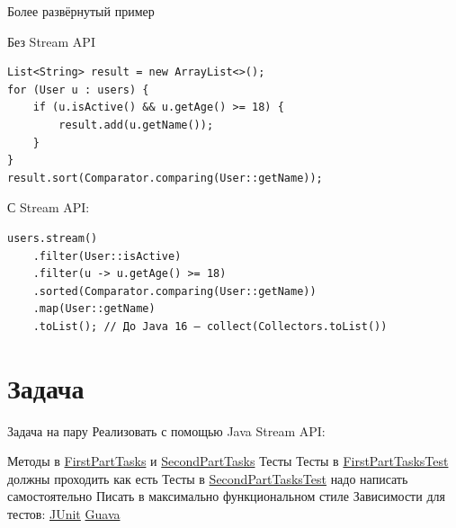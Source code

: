 \documentclass{../../slides-style}
\begin{document}
    \begin{frame}[fragile]{Более развёрнутый пример}
        \begin{small}
            Без Stream API
            \begin{verbatim}
List<String> result = new ArrayList<>();
for (User u : users) {
    if (u.isActive() && u.getAge() >= 18) {
        result.add(u.getName());
    }
}
result.sort(Comparator.comparing(User::getName));
        \end{verbatim}

            \vspace{5mm}
            С Stream API:
            \begin{verbatim}
users.stream()
    .filter(User::isActive)
    .filter(u -> u.getAge() >= 18)
    .sorted(Comparator.comparing(User::getName))
    .map(User::getName)
    .toList(); // До Java 16 — collect(Collectors.toList())
            \end{verbatim}
        \end{small}
    \end{frame}

    \section{Задача}

    \begin{frame}{Задача на пару}
        Реализовать с помощью Java Stream API:
        \begin{outline}
            \1 Методы в \href{https://gist.github.com/yurii-litvinov/527f289e454c296f7505ccaf79873428\#file-firstparttasks-java}{FirstPartTasks} и \href{https://gist.github.com/yurii-litvinov/527f289e454c296f7505ccaf79873428\#file-secondparttasks-java}{SecondPartTasks}
            \1 Тесты
                \2 Тесты в \href{https://gist.github.com/yurii-litvinov/527f289e454c296f7505ccaf79873428\#file-firstparttaskstest-java}{FirstPartTasksTest} должны проходить как есть
                \2 Тесты в \href{https://gist.github.com/yurii-litvinov/527f289e454c296f7505ccaf79873428\#file-secondparttaskstest-java}{SecondPartTasksTest} надо написать самостоятельно
            \1 Писать в максимально функциональном стиле
            \1 Зависимости для тестов:
                \2 \href{https://mvnrepository.com/artifact/org.junit.jupiter/junit-jupiter}{JUnit}
                \2 \href{https://mvnrepository.com/artifact/com.google.guava/guava}{Guava}
        \end{outline}
    \end{frame}
\end{document}
